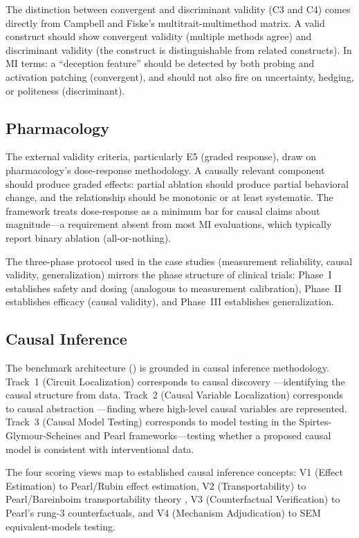 \documentclass[10pt]{article}
\begin{document}
The distinction between convergent and discriminant validity (C3 and C4) comes directly from Campbell and Fiske's multitrait-multimethod matrix. A valid construct should show convergent validity (multiple methods agree) and discriminant validity (the construct is distinguishable from related constructs). In MI terms: a ``deception feature'' should be detected by both probing and activation patching (convergent), and should not also fire on uncertainty, hedging, or politeness (discriminant).

\subsection{Pharmacology}
\label{sec:pharma}

The external validity criteria, particularly E5 (graded response), draw on pharmacology's dose-response methodology. A causally relevant component should produce graded effects: partial ablation should produce partial behavioral change, and the relationship should be monotonic or at least systematic. The framework treats dose-response as a minimum bar for causal claims about magnitude---a requirement absent from most MI evaluations, which typically report binary ablation (all-or-nothing).

The three-phase protocol used in the case studies (measurement reliability, causal validity, generalization) mirrors the phase structure of clinical trials: Phase~I establishes safety and dosing (analogous to measurement calibration), Phase~II establishes efficacy (causal validity), and Phase~III establishes generalization.

\subsection{Causal Inference}
\label{sec:causal}

The benchmark architecture () is grounded in causal inference methodology. Track~1 (Circuit Localization) corresponds to causal discovery \citep{spirtes2000causation}---identifying the causal structure from data. Track~2 (Causal Variable Localization) corresponds to causal abstraction \citep{geiger2023causal}---finding where high-level causal variables are represented. Track~3 (Causal Model Testing) corresponds to model testing in the Spirtes-Glymour-Scheines and Pearl frameworks---testing whether a proposed causal model is consistent with interventional data.

The four scoring views map to established causal inference concepts: V1 (Effect Estimation) to Pearl/Rubin effect estimation, V2 (Transportability) to Pearl/Bareinboim transportability theory \citep{pearl2011transportability}, V3 (Counterfactual Verification) to Pearl's rung-3 counterfactuals, and V4 (Mechanism Adjudication) to SEM equivalent-models testing.
\end{document}
